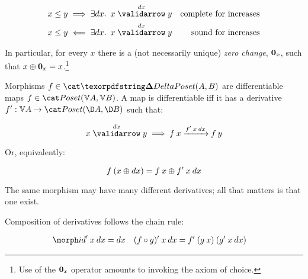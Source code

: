 \documentclass[nomarginums]{rntz}\usepackage[tablet]{fantasy}%
\begin{document}
\nopagebreak[2]
\begin{align*}
  x \le y &\implies \ex{\dx} \vld{\dx} x y
  & \text{complete for increases}\\
  x \le y &\impliedby \ex{\dx} \vld{\dx} x y
  & \text{sound for increases}
\end{align*}

\noindent In particular, for every $x$ there is a (not necessarily unique)
\emph{zero change}, $\boldsymbol{0}_x$, such that $x \mathbin{\oplus} \boldsymbol{0}_x = x$.\footnote{Use of
  the $\boldsymbol{0}_x$ operator amounts to invoking the axiom of choice.}

Morphisms $f \in \CP(A,B)$ are differentiable maps $f \in \Poset(\vals A, \vals
B)$. A map is differentiable iff it has a derivative $\deriv f : \vals A \to
\Poset(\chgs A, \chgs B)$ such that:

\nopagebreak[2]
\[ \vld{\dx} x y \implies \longvld{\deriv f\<x\<\dx}{f\<x}{f\<y}\]

\noindent Or, equivalently:

\nopagebreak[2]
\[ f\<(x \upd \dx) = f\<x \upd \deriv f\<x\<\dx \]


\noindent
The same morphism may have many different derivatives; all that matters is that
one exist.

Composition of derivatives follows the chain rule:

\nopagebreak[2]
\begin{align*}
  \deriv\id \<x\<\dx &= \dx
  & \deriv{(f \circ g)} \<x\<\dx &= \deriv f \<(g\<x) \<(\deriv g\<x\<\dx)
\end{align*}



\end{document}
